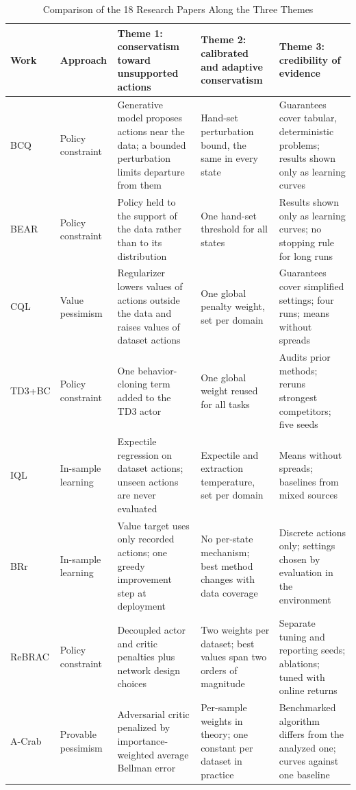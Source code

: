 \documentclass[conference]{IEEEtran}
\begin{document}
\begin{table}[!t]
\caption{Comparison of the 18 Research Papers Along the Three Themes}
\label{tab:comparison}
\centering
\footnotesize
\renewcommand{\arraystretch}{1.15}
\begin{tabularx}{\textwidth}{@{}P{0.105\textwidth}P{0.095\textwidth}LLL@{}}
\toprule
Work & Approach & Theme 1: conservatism toward unsupported actions & Theme 2: calibrated and adaptive conservatism & Theme 3: credibility of evidence \\
\midrule
BCQ \cite{fujimoto2019bcq} & Policy constraint & Generative model proposes actions near the data; a bounded perturbation limits departure from them & Hand-set perturbation bound, the same in every state & Guarantees cover tabular, deterministic problems; results shown only as learning curves \\
BEAR \cite{kumar2019bear} & Policy constraint & Policy held to the support of the data rather than to its distribution & One hand-set threshold for all states & Results shown only as learning curves; no stopping rule for long runs \\
CQL \cite{kumar2020cql} & Value pessimism & Regularizer lowers values of actions outside the data and raises values of dataset actions & One global penalty weight, set per domain & Guarantees cover simplified settings; four runs; means without spreads \\
TD3+BC \cite{fujimoto2021td3bc} & Policy constraint & One behavior-cloning term added to the TD3 actor & One global weight reused for all tasks & Audits prior methods; reruns strongest competitors; five seeds \\
IQL \cite{kostrikov2022iql} & In-sample learning & Expectile regression on dataset actions; unseen actions are never evaluated & Expectile and extraction temperature, set per domain & Means without spreads; baselines from mixed sources \\
BRr \cite{gulcehre2020brr} & In-sample learning & Value target uses only recorded actions; one greedy improvement step at deployment & No per-state mechanism; best method changes with data coverage & Discrete actions only; settings chosen by evaluation in the environment \\
ReBRAC \cite{tarasov2023rebrac} & Policy constraint & Decoupled actor and critic penalties plus network design choices & Two weights per dataset; best values span two orders of magnitude & Separate tuning and reporting seeds; ablations; tuned with online returns \\
A-Crab \cite{zhu2023acrab} & Provable pessimism & Adversarial critic penalized by importance-weighted average Bellman error & Per-sample weights in theory; one constant per dataset in practice & Benchmarked algorithm differs from the analyzed one; curves against one baseline \\

\end{tabularx}
\end{table}
\end{document}
